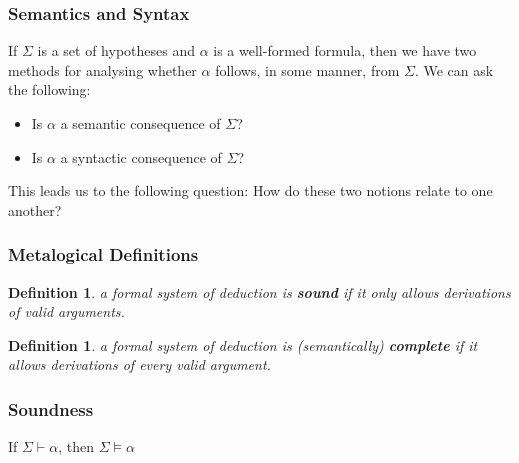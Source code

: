 \documentclass{beamer}
\theoremstyle{indentDefn} \newtheorem{defn}[]{Definition}
\begin{document}
\begin{frame}
	\frametitle{Semantics and Syntax}
	If $\Sigma$ is a set of hypotheses and $\alpha$ is a well-formed formula, then we have two methods for analysing whether $\alpha$ follows, in some manner, from $\Sigma$. We can ask the following: 
	
	\vspace{0.5cm}
	
	\begin{itemize}
		\item Is $\alpha$ a semantic consequence of $\Sigma$? 
		\item Is $\alpha$ a syntactic consequence of $\Sigma$? 		
	\end{itemize}

	\vspace{0.5cm}
	
	This leads us to the following question: How do these two notions relate to one another? 
	
	
\end{frame}

\begin{frame}
	\frametitle{Metalogical Definitions}
	
	\begin{defn} a formal system of deduction is {\bf sound} if it only allows derivations of valid arguments. %
	\end{defn}
	
	\vspace{2cm}
	
	\begin{defn} a formal system of deduction is (semantically) {\bf complete} if it allows derivations of every valid argument. %
	\end{defn}
	
\end{frame}

\begin{frame}
	\frametitle{Soundness}
	
	 If $\Sigma \vdash \alpha $, then $\Sigma \vDash \alpha $
	
	\vspace{0.5cm}
	
	
	\vspace{5cm}
	
	
\end{frame}
\end{document}
